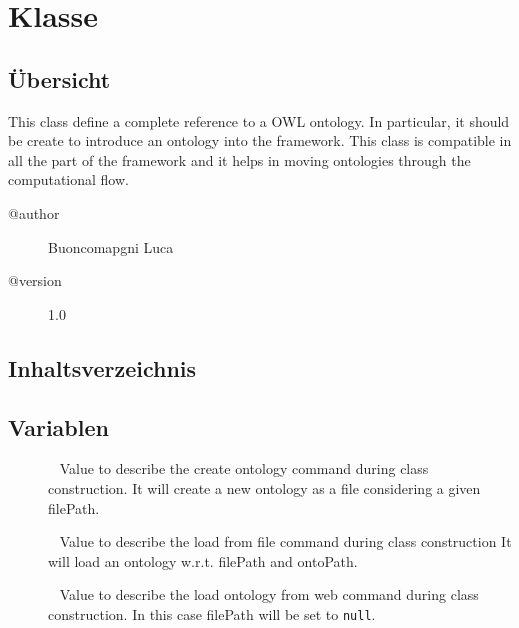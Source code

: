 
\section[OWLReferences]{Klasse }\label{ontologyFramework.OFContextManagement.OWLReferences-class}
\subsection{Übersicht}
This class define a complete reference to a OWL ontology. 
 In particular, it should be create to introduce an ontology 
 into the framework. This class is compatible in all the part of the framework
 and it helps in moving ontologies through the computational flow.
\begin{description}
\item[@author] 
Buoncomapgni Luca
\item[@version] 
1.0
\end{description}
\subsection{Inhaltsverzeichnis}
\subsection{Variablen}
\begin{description}
\item[{\label{ontologyFramework.OFContextManagement.OWLReferences.CREATEcommand}}]
~ Value to describe the create ontology command during class construction. 
 It will create a new ontology as a file considering a given filePath.
\item[{\label{ontologyFramework.OFContextManagement.OWLReferences.LOADFROMFILEcommand}}]
~ Value to describe the load from file command during class construction
 It will load an ontology w.r.t. filePath and ontoPath.
\item[{\label{ontologyFramework.OFContextManagement.OWLReferences.LOADFROMWEBcommand}}]
~ Value to describe the load ontology from web command during class construction.
 In this case filePath will be set to \verb!null!.
\end{description}
